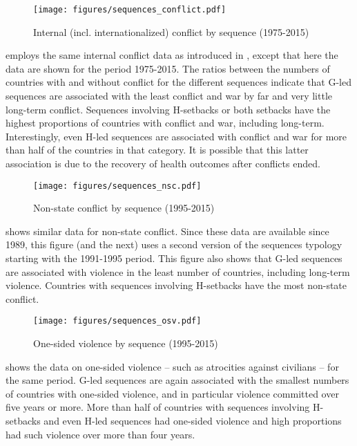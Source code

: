 \documentclass[12pt]{article}
\begin{document}
\begin{figure}[htbp]
    \centering
    \caption{Internal (incl. internationalized) conflict by sequence (1975-2015)}
    \label{sequences_conflict}
    \texttt{[image: figures/sequences\_conflict.pdf]}
\end{figure}

 employs the same internal conflict data as introduced in , except that here the data are shown for the period 1975-2015.
The ratios between the numbers of countries with and without conflict for the different sequences indicate that G-led sequences are associated with the least conflict and war by far and very little long-term conflict.
Sequences involving H-setbacks or both setbacks have the highest proportions of countries with conflict and war, including long-term.
Interestingly, even H-led sequences are associated with conflict and war for more than half of the countries in that category.
It is possible that this latter association is due to the recovery of health outcomes after conflicts ended.

\begin{figure}[htbp]
    \centering
    \caption{Non-state conflict by sequence (1995-2015)}
    \label{sequences_nsc}
    \texttt{[image: figures/sequences\_nsc.pdf]}
\end{figure}

 shows similar data for non-state conflict. Since these data are available since 1989, this figure (and the next) uses a second version of the sequences typology starting with the 1991-1995 period.
This figure also shows that G-led sequences are associated with violence in the least number of countries, including long-term violence.
Countries with sequences involving H-setbacks have the most non-state conflict.

\begin{figure}[htbp]
    \centering
    \caption{One-sided violence by sequence (1995-2015)}
    \label{sequences_osv}
    \texttt{[image: figures/sequences\_osv.pdf]}
\end{figure}

 shows the data on one-sided violence -- such as atrocities against civilians -- for the same period.
G-led sequences are again associated with the smallest numbers of countries with one-sided violence, and in particular violence committed over five years or more.
More than half of countries with sequences involving H-setbacks and even H-led sequences had one-sided violence and high proportions had such violence over more than four years.
\end{document}
